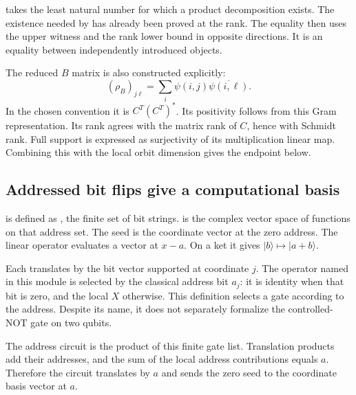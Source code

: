 
 takes the least natural number for which a product decomposition exists. The existence needed by  has already been proved at the rank. The equality  then uses the upper witness and the rank lower bound in opposite directions. It is an equality between independently introduced objects.

The reduced $B$ matrix is also constructed explicitly:
\[
(\rho_B)_{j\ell}=\sum_i\psi(i,j)\overline{\psi(i,\ell)}.
\]
In the chosen convention it is $C^T(C^T)^*$. Its positivity follows from this Gram representation. Its rank agrees with the matrix rank of $C$, hence with Schmidt rank. Full support is expressed as surjectivity of its multiplication linear map. Combining this with the local orbit dimension gives the endpoint below.



\subsection{Addressed bit flips give a computational basis}
 is defined as , the finite set of bit strings.  is the complex vector space of functions on that address set. The seed is the coordinate vector at the zero address. The linear operator  evaluates a vector at $x-a$. On a ket it gives $|b\rangle\mapsto|a+b\rangle$.

Each  translates by the bit vector supported at coordinate $j$. The operator named  in this module is selected by the classical address bit $a_j$: it is identity when that bit is zero, and the local $X$ otherwise. This definition selects a gate according to the address. Despite its name, it does not separately formalize the controlled-NOT gate on two qubits.

The address circuit is the product of this finite gate list. Translation products add their addresses, and the sum of the local address contributions equals $a$. Therefore the circuit translates by $a$ and sends the zero seed to the coordinate basis vector at $a$.

